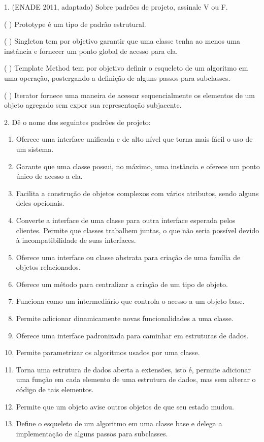 \documentclass[
  11pt,
  twoside]{book}
\begin{document}
1. (ENADE 2011, adaptado) Sobre padrões de projeto, assinale V ou F.

( ) Prototype é um tipo de padrão estrutural.

( ) Singleton tem por objetivo garantir que uma classe tenha ao menos
uma instância e fornecer um ponto global de acesso para ela.

( ) Template Method tem por objetivo definir o esqueleto de um algoritmo
em uma operação, postergando a definição de alguns passos para
subclasses.

( ) Iterator fornece uma maneira de acessar sequencialmente os elementos
de um objeto agregado sem expor sua representação subjacente.

2. Dê o nome dos seguintes padrões de projeto:

\begin{enumerate}
\def\labelenumi{\alph{enumi})}
\item
  Oferece uma interface unificada e de alto nível que torna mais fácil o
  uso de um sistema.
\item
  Garante que uma classe possui, no máximo, uma instância e oferece um
  ponto único de acesso a ela.
\item
  Facilita a construção de objetos complexos com vários atributos, sendo
  alguns deles opcionais.
\item
  Converte a interface de uma classe para outra interface esperada pelos
  clientes. Permite que classes trabalhem juntas, o que não seria
  possível devido à incompatibilidade de suas interfaces.
\item
  Oferece uma interface ou classe abstrata para criação de uma família
  de objetos relacionados.
\item
  Oferece um método para centralizar a criação de um tipo de objeto.
\item
  Funciona como um intermediário que controla o acesso a um objeto base.
\item
  Permite adicionar dinamicamente novas funcionalidades a uma classe.
\item
  Oferece uma interface padronizada para caminhar em estruturas de
  dados.
\item
  Permite parametrizar os algoritmos usados por uma classe.
\item
  Torna uma estrutura de dados aberta a extensões, isto é, permite
  adicionar uma função em cada elemento de uma estrutura de dados, mas
  sem alterar o código de tais elementos.
\item
  Permite que um objeto avise outros objetos de que seu estado mudou.
\item
  Define o esqueleto de um algoritmo em uma classe base e delega a
  implementação de alguns passos para subclasses.
\end{enumerate}
\end{document}
